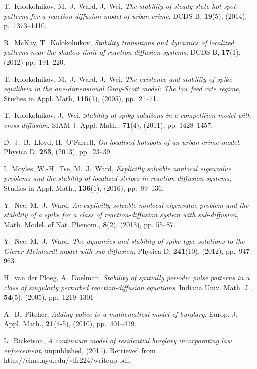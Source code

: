 \documentclass{article}%
\begin{document}
\begin{thebibliography}{99}
 T.~Kolokolnikov, M.~J.~Ward, J.~Wei, \textit{The
  stability of steady-state hot-spot patterns for a reaction-diffusion
  model of urban crime}, DCDS-B, \textbf{19}(5), (2014),
  p.~1373--1410.

 R.~McKay, T.~Kolokolnikov, \textit{Stability
  transitions and dynamics of localized patterns near the shadow limit
  of reaction-diffusion systems}, DCDS-B, \textbf{17}(1), (2012)
  pp.~191--220.

 T.~Kolokolnikov, M.~J.~Ward, J.~Wei, \textit{The 
   existence and stability of spike equilibria in the one-dimensional 
   Gray-Scott model: The low feed rate regime}, Studies in Appl.
   Math, \textbf{115}(1), (2005), pp.~21--71.

 T.~Kolokolnikov, J.~Wei, \textit{Stability
of spiky solutions in a competition model with cross-diffusion}, SIAM
J. Appl. Math., \textbf{71}(4), (2011), pp. 1428--1457.

 D.~J.~B.~Lloyd, H.~O'Farrell, \textit{On
  localised hotspots of an urban crime model}, Physica D,
  \textbf{253}, (2013), pp.~23--39.

 I.~Moyles, W.-H.~Tse, M.~J.~Ward,
  \textit{Explicitly solvable nonlocal eigenvalue problems and the
    stability of localized stripes in reaction-diffusion systems},
  Studies in Appl. Math., \textbf{136}(1), (2016), pp.~89--136.

 Y.~Nec, M.~J.~Ward, \textit{An explicitly solvable
nonlocal eigenvalue problem and the stability of a spike for a class
of reaction-diffusion system with sub-diffusion}, Math. Model. of
Nat. Phenom., \textbf{8}(2), (2013), pp. 55--87.

 Y.~Nec, M.~J.~Ward, \textit{The dynamics and stability of 
spike-type solutions to the Gierer-Meinhardt model with sub-diffusion},
Physica D, \textbf{241}(10), (2012), pp.~947--963.

 H.~van der Ploeg, A.~Doelman, \textit{
  Stability of spatially periodic pulse patterns in a class of
  singularly perturbed reaction-diffusion equations}, Indiana
  Univ. Math. J., \textbf{54}(5), (2005), pp.~1219--1301

 A.~B.~Pitcher, \textit{Adding police to a
  mathematical model of burglary}, Europ. J. Appl. Math.,
  \textbf{21}(4-5), (2010), pp.~401--419.

 L.~Ricketson, \textit{A continuum model of residential
  burglary incorporating law enforcement}, unpublished,
  (2011). Retrieved from
  http://cims.nyu.edu/\textasciitilde{}lfr224/writeup.pdf.


\end{thebibliography}
\end{document}
